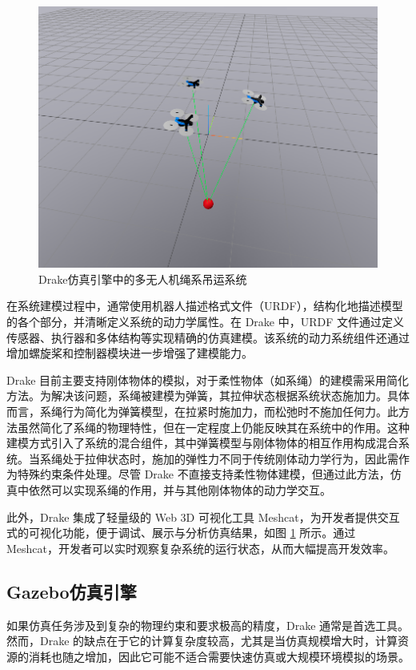 \documentclass[lang=chs, degree=master, blindreview=false, winfonts=true]{yanputhesis}
\begin{document}
\begin{figure}[hbt!]
	\centering
	\includegraphics[width=36pc]{picture/5_1.png} 
	\caption{Drake仿真引擎中的多无人机绳系吊运系统} 
	\label{5_1}
\end{figure}
在系统建模过程中，通常使用机器人描述格式文件（URDF），结构化地描述模型的各个部分，并清晰定义系统的动力学属性。在 Drake 中，URDF 文件通过定义传感器、执行器和多体结构等实现精确的仿真建模。该系统的动力系统组件还通过增加螺旋桨和控制器模块进一步增强了建模能力。


Drake 目前主要支持刚体物体的模拟，对于柔性物体（如系绳）的建模需采用简化方法。为解决该问题，系绳被建模为弹簧，其拉伸状态根据系统状态施加力。具体而言，系绳行为简化为弹簧模型，在拉紧时施加力，而松弛时不施加任何力。此方法虽然简化了系绳的物理特性，但在一定程度上仍能反映其在系统中的作用。这种建模方式引入了系统的混合组件，其中弹簧模型与刚体物体的相互作用构成混合系统。当系绳处于拉伸状态时，施加的弹性力不同于传统刚体动力学行为，因此需作为特殊约束条件处理。尽管 Drake 不直接支持柔性物体建模，但通过此方法，仿真中依然可以实现系绳的作用，并与其他刚体物体的动力学交互。

此外，Drake 集成了轻量级的 Web 3D 可视化工具 Meshcat，为开发者提供交互式的可视化功能，便于调试、展示与分析仿真结果，如图 \ref{5_1} 所示。通过 Meshcat，开发者可以实时观察复杂系统的运行状态，从而大幅提高开发效率。

\subsection{Gazebo仿真引擎}
如果仿真任务涉及到复杂的物理约束和要求极高的精度，Drake 通常是首选工具。然而，Drake 的缺点在于它的计算复杂度较高，尤其是当仿真规模增大时，计算资源的消耗也随之增加，因此它可能不适合需要快速仿真或大规模环境模拟的场景。
\end{document}
